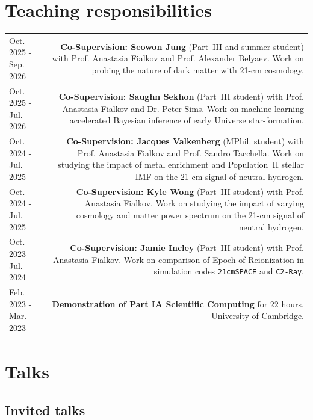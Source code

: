 \documentclass{article}
\begin{document}
\section*{Teaching responsibilities}

\begin{longtable}{L!{\vrule}R}

	Oct. 2025 - Sep. 2026 & \textbf{Co-Supervision: Seowon Jung} (Part~III and summer student) with Prof. Anastasia Fialkov and Prof. Alexander Belyaev. Work on probing the nature of dark matter with 21-cm cosmology. \\

	Oct. 2025 - Jul. 2026 & \textbf{Co-Supervision: Saughn Sekhon} (Part~III student) with Prof. Anastasia Fialkov and Dr. Peter Sims. Work on machine learning accelerated Bayesian inference of early Universe star-formation. \\

	Oct. 2024 - Jul. 2025 & \textbf{Co-Supervision: Jacques Valkenberg} (MPhil. student) with Prof. Anastasia Fialkov and Prof. Sandro Tacchella. Work on studying the impact of metal enrichment and Population~II stellar IMF on the 21-cm signal of neutral hydrogen. \\

	Oct. 2024 - Jul. 2025 & \textbf{Co-Supervision: Kyle Wong} (Part~III student) with Prof. Anastasia Fialkov. Work on studying the impact of varying cosmology and matter power spectrum on the 21-cm signal of neutral hydrogen. \\

	Oct. 2023 - Jul. 2024 & \textbf{Co-Supervision: Jamie Incley} (Part~III student) with Prof. Anastasia Fialkov. Work on comparison of Epoch of Reionization in simulation codes \texttt{21cmSPACE} and \texttt{C2-Ray}. \\

    Feb. 2023 - Mar. 2023 & \textbf{Demonstration of Part IA Scientific Computing} for 22 hours, University of Cambridge.\\

\end{longtable}

\section*{Talks}

\subsection*{Invited talks}
\end{document}

